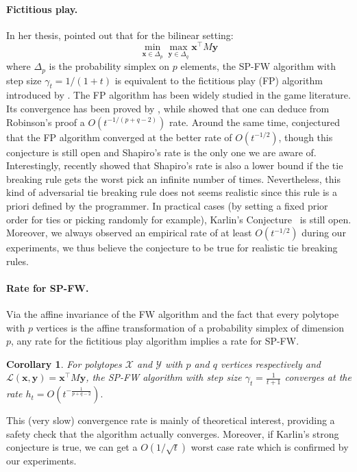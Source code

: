 \documentclass[twoside]{article}
\renewcommand{\L}{\mathcal{L}}
\newcommand{\X}{\mathcal{X}}
\newcommand{\Y}{\mathcal{Y}}
\newcommand{\x}{\bm{x}}
\newcommand{\y}{\bm{y}}
\newtheorem{corollary}[definition]{Corollary}
\newcommand{\0}{\mathbf{0}} %
\begin{document}
\paragraph{Fictitious play.} %
\label{par:the_fictitious_play_}
  In her thesis, \citet[\S~4.3.1]{hammond1984solving} pointed out that for the bilinear setting:
\begin{equation}\label{eq:pb_bilin}
  \min_{\x \in \Delta_p} \max_{\y \in \Delta_q} \x^\top M \y 
\end{equation}
where $\Delta_p$ is the probability simplex on $p$ elements,
the SP-FW algorithm with step size $\gamma_t = 1/ \left( 1+t \right)$ is equivalent to the fictitious play (FP) algorithm introduced by \citet{brown1951iterative}. The FP algorithm has been widely studied in the game literature. Its convergence has been proved by \citet{robinson1951iterative}, while \citet{shapiro1958note} showed that one can deduce from Robinson's proof a $O(t^{-1/(p+q-2)})$ rate.
Around the same time, \citet{karlin1960mathematical} conjectured that the FP algorithm converged at the better rate of $O(t^{-1/2})$, though this conjecture is still open and Shapiro's rate is the only one we are aware of.
Interestingly, \citet{daskalakis2014counter} recently showed that Shapiro's rate is also a lower bound if the tie breaking rule gets the worst pick an infinite number of times.
Nevertheless, this kind of adversarial tie breaking rule does not seems realistic since this rule is a priori defined by the programmer.
In practical cases (by setting a fixed prior order for ties or picking randomly for example), Karlin's Conjecture~\citep{karlin1960mathematical} is still open. Moreover, we always observed an empirical rate of at least $O(t^{-1/2})$ during our experiments, we thus believe the conjecture to be true for realistic tie breaking rules.

%
 \paragraph{Rate for SP-FW.} %
 \label{par:Rate for SP-FW.}
 Via the affine invariance of the FW algorithm and the fact that every polytope with $p$ vertices is the affine transformation of a probability simplex of dimension $p$, any rate for the fictitious play algorithm implies a rate for SP-FW.
\begin{corollary}\label{cor:Bilin}
For polytopes $\X$ and $\Y$ with $p$ and $q$ vertices respectively and $\L(\x,\y) = \x^\top M \y$, the SP-FW algorithm with step size $\gamma_t = \frac{1}{t+1}$ converges at the rate $ h_t = O \left(t^{-\frac{1}{p+q-2}} \right).$
\end{corollary}
 This (very slow) convergence rate is mainly of theoretical interest, providing a safety check that the algorithm actually converges.
 Moreover, if Karlin's strong conjecture is true, we can get a $O (1 /\sqrt{t})$ worst case rate which is confirmed by our experiments. 
  
\end{document}
